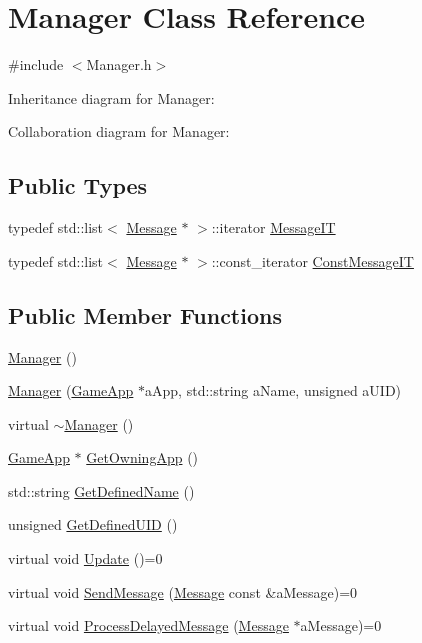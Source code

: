 \hypertarget{classManager}{}\section{Manager Class Reference}
\label{classManager}


{\ttfamily \#include $<$Manager.\+h$>$}



Inheritance diagram for Manager\+:


Collaboration diagram for Manager\+:
\subsection*{Public Types}
\begin{DoxyCompactItemize}
\item 
typedef std\+::list$<$ \hyperlink{classMessage}{Message} $\ast$ $>$\+::iterator \hyperlink{classManager_a076ef5e1579b75f8c614bd2f1492fc1f}{Message\+IT}
\item 
typedef std\+::list$<$ \hyperlink{classMessage}{Message} $\ast$ $>$\+::const\+\_\+iterator \hyperlink{classManager_aef9931b456639fc47d53241aac0a359c}{Const\+Message\+IT}
\end{DoxyCompactItemize}
\subsection*{Public Member Functions}
\begin{DoxyCompactItemize}
\item 
\hyperlink{classManager_a1658ff9f18e38ccd9cb8b0b371b9c20b}{Manager} ()
\item 
\hyperlink{classManager_a55c7070e93b42767d2d8533e42c4d93a}{Manager} (\hyperlink{classGameApp}{Game\+App} $\ast$a\+App, std\+::string a\+Name, unsigned a\+U\+ID)
\item 
virtual \hyperlink{classManager_a3dbc694b640c70009c5e0dec515d692c}{$\sim$\+Manager} ()
\item 
\hyperlink{classGameApp}{Game\+App} $\ast$ \hyperlink{classManager_ae23e9b444e64294c7aecbb1d7c45d74c}{Get\+Owning\+App} ()
\item 
std\+::string \hyperlink{classManager_a0f832758f5cab37c766bfc63ba029fcd}{Get\+Defined\+Name} ()
\item 
unsigned \hyperlink{classManager_a512c837bdf02071dc149955bd60fd341}{Get\+Defined\+U\+ID} ()
\item 
virtual void \hyperlink{classManager_adeae9d4bc705f47837c2eece7d9eb523}{Update} ()=0
\item 
virtual void \hyperlink{classManager_a150f34a2afd05d01f468e1ecc8ce7912}{Send\+Message} (\hyperlink{classMessage}{Message} const \&a\+Message)=0
\item 
virtual void \hyperlink{classManager_a2cf644ec0476f3a07ca5b977953a5925}{Process\+Delayed\+Message} (\hyperlink{classMessage}{Message} $\ast$a\+Message)=0
\end{DoxyCompactItemize}
